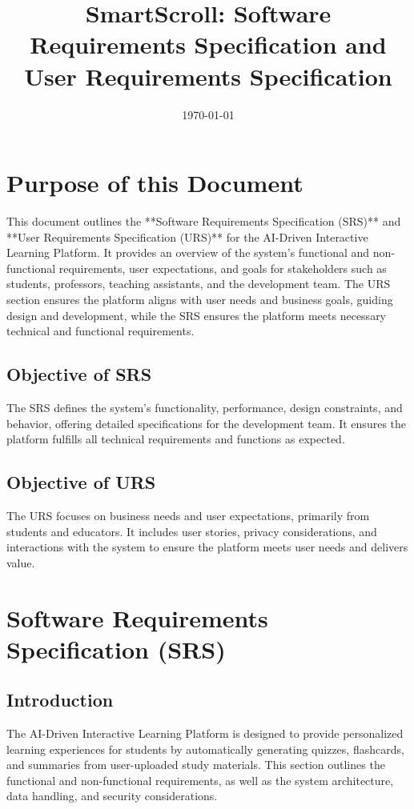\documentclass{article}
\title{SmartScroll: Software Requirements Specification and User Requirements Specification}
\author{}
\date{\today}
\begin{document}
\maketitle


\section{Purpose of this Document}
This document outlines the **Software Requirements Specification (SRS)** and **User Requirements Specification (URS)** for the AI-Driven Interactive Learning Platform. It provides an overview of the system's functional and non-functional requirements, user expectations, and goals for stakeholders such as students, professors, teaching assistants, and the development team. The URS section ensures the platform aligns with user needs and business goals, guiding design and development, while the SRS ensures the platform meets necessary technical and functional requirements.

\subsection{Objective of SRS}
The SRS defines the system’s functionality, performance, design constraints, and behavior, offering detailed specifications for the development team. It ensures the platform fulfills all technical requirements and functions as expected.

\subsection{Objective of URS}
The URS focuses on business needs and user expectations, primarily from students and educators. It includes user stories, privacy considerations, and interactions with the system to ensure the platform meets user needs and delivers value.


\section{Software Requirements Specification (SRS)}

\subsection{Introduction}
The AI-Driven Interactive Learning Platform is designed to provide personalized learning experiences for students by automatically generating quizzes, flashcards, and summaries from user-uploaded study materials. This section outlines the functional and non-functional requirements, as well as the system architecture, data handling, and security considerations.
\end{document}
